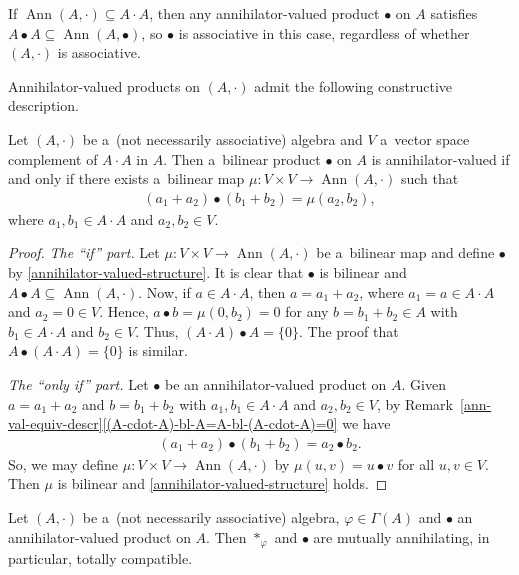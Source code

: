\documentclass{jonasart}
\newcommand{\bl}{\bullet}
\newcommand{\G}{\Gamma}
\newcommand{\sst}{\subseteq}
\newcommand{\vf}{\varphi}
\DeclareMathOperator{\Ann}{Ann}
\begin{document}
	\begin{remark}\label{bl-associative-if-A^2 -sst-Ann(A)}
		If $\Ann(A,\cdot)\sst A\cdot A$, then any annihilator-valued product $\bl$ on $A$ satisfies $A\bl A\sst\Ann(A,\bl)$, so $\bl$ is associative in this case, regardless of whether $(A,\cdot)$ is associative.
	\end{remark}
	Annihilator-valued products on $(A,\cdot)$ admit the following constructive description.
	\begin{lemma}
		Let $(A,\cdot)$ be a~(not necessarily associative) algebra and $V$ a~vector space complement of $A\cdot A$ in $A$. Then a~bilinear product $\bl$ on $A$ is annihilator-valued if and only if there exists a~bilinear map $\mu:V\times V\to\Ann(A,\cdot)$ such that
		\begin{align}\label{annihilator-valued-structure}
			(a_1 +a_2 )\bl(b_1 +b_2 )=\mu(a_2,b_2 ),
		\end{align}
		where $a_1,b_1\in A\cdot A$ and $a_2,b_2\in V$.
	\end{lemma}

	\begin{proof}
		\textit{The ``if'' part.} Let $\mu:V\times V\to\Ann(A,\cdot)$ be a~bilinear map and define $\bl$ by \eqref{annihilator-valued-structure}. It is clear that $\bl$ is bilinear and $A\bl A\sst\Ann(A,\cdot)$. Now, if $a\in A\cdot A$, then $a=a_1 +a_2$, where $a_1 =a\in A\cdot A$ and $a_2 =0\in V$. Hence, $a\bl b=\mu(0,b_2 )=0$ for any $b=b_1 +b_2\in A$ with $b_1\in A\cdot A$ and $b_2\in V$. Thus, $(A\cdot A)\bl A=\{0\}$. The proof that $A\bl (A\cdot A)=\{0\}$ is similar.

		\textit{The ``only if'' part.} Let $\bl$ be an annihilator-valued product on $A$. Given $a=a_1 +a_2$ and $b=b_1 +b_2$ with $a_1,b_1\in A\cdot A$ and $a_2,b_2\in V$, by Remark~\ref{ann-val-equiv-descr}\eqref{(A-cdot-A)-bl-A=A-bl-(A-cdot-A)=0} we have
		\begin{align*}
			(a_1 +a_2 )\bl(b_1 +b_2 )=a_2\bl b_2.
		\end{align*}
		So, we may define $\mu:V\times V\to\Ann(A,\cdot)$ by $\mu(u,v)=u\bl v$ for all $u,v\in V$. Then $\mu$ is bilinear and \eqref{annihilator-valued-structure} holds.
	\end{proof}

	\begin{lemma}\label{mixed-monomials-*_v f-bl-are-zero}
		Let $(A,\cdot)$ be a~(not necessarily associative) algebra, $\vf\in\G(A)$ and $\bl$ an annihilator-valued product on $A$. Then $*_\vf$ and $\bl$ are mutually annihilating, in particular, totally compatible.
	\end{lemma}
\end{document}
